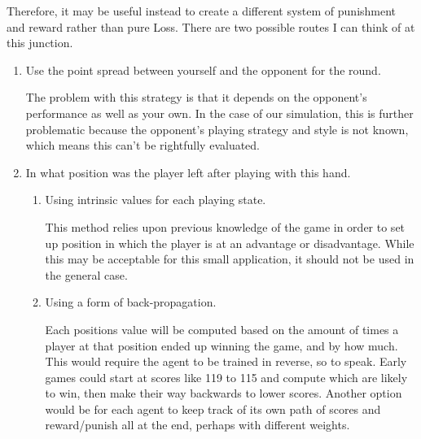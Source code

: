 Therefore, it may be useful instead to create a different system of punishment
and reward rather than pure Loss.
%
There are two possible routes I can think of at this junction.
%
\begin{enumerate}
\item Use the point spread between yourself and the opponent for the round.

	The problem with this strategy is that it depends on the opponent's
	performance as well as your own.
	In the case of our simulation, this is further problematic because the
	opponent's playing strategy and style is not known,
	which means this can't be rightfully evaluated.

\item In what position was the player left after playing with this hand.
	\begin{enumerate}
	\item Using intrinsic values for each playing state.

		This method relies upon previous knowledge of the game in order to set
		up position in which the player is at an advantage or disadvantage.
		While this may be acceptable for this small application, it should not
		be used in the general case.

	\item Using a form of back-propagation.

		Each positions value will be computed based on the amount of times a
		player at that position ended up winning the game, and by how much.
		This would require the agent to be trained in reverse, so to speak.
		Early games could start at scores like 119 to 115 and compute which are
		likely to win, then make their way backwards to lower scores.
		Another option would be for each agent to keep track of its own path
		of scores and reward/punish all at the end, perhaps with different
		weights.

	\end{enumerate}
\end{enumerate}
